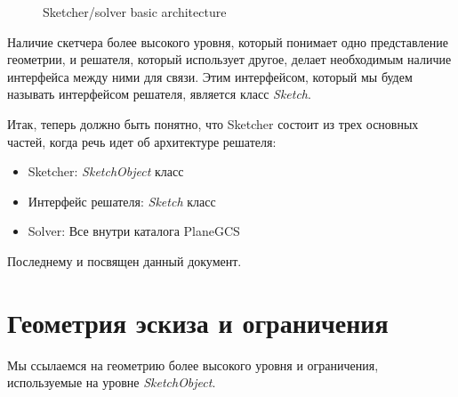 \documentclass[12pt,twoside,a4paper]{book}
\newcommand{\SketchObject}{\emph{SketchObject}}
\newcommand{\Sketch}{\emph{Sketch}}
\begin{document}
    \begin{figure}
    \caption{Sketcher/solver basic architecture}
    \end{figure}

    Наличие скетчера более высокого уровня, который понимает одно представление геометрии, и решателя, который использует другое, делает необходимым наличие интерфейса между ними для связи. Этим интерфейсом, который мы будем называть интерфейсом решателя, является класс \Sketch{}.

    Итак, теперь должно быть понятно, что Sketcher состоит из трех основных частей, когда речь идет об архитектуре решателя:

    \begin{itemize}
    \item Sketcher: \SketchObject{} класс
    \item Интерфейс решателя: \Sketch{} класс
    \item Solver: Все внутри каталога PlaneGCS
    \end{itemize}

    Последнему и посвящен данный документ.

    \section {Геометрия эскиза и ограничения}

    Мы ссылаемся на геометрию более высокого уровня и ограничения, используемые на уровне \SketchObject{}.
\end{document}
